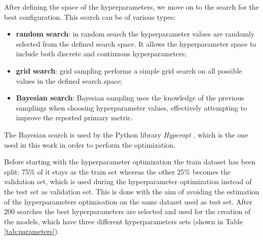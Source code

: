 \documentclass[a4paper, oneside, 11pt, openright]{book}
\begin{document}
				After defining the space of the hyperparameters, we move on to the search for the best configuration. This search can be of various types:
				\begin{itemize}
					\item \textbf{random search}: in random search the hyperparameter values are randomly selected from the defined search space. It allows the  hyperparameter space to include both discrete and continuous hyperparameters;
					\item \textbf{grid search}: grid sampling performs a simple grid search on all possible values in the defined search space;
					\item \textbf{Bayesian search}: Bayesian sampling uses the knowledge of the previous samplings when choosing hyperparameter values, effectively attempting to improve the reported primary metric. %
				\end{itemize}
				The Bayesian search is used by the Python library \textit{Hyperopt} \cite{Hyperopt}, which is the one used in this work in order to perform the optimization.
				
				Before starting with the hyperparameter optimization the train dataset has been split: 75\% of it stays as the train set whereas the other 25\% becomes the validation set, which is used during the hyperparameter optimization instead of the test set as validation set. This is done with the aim of avoiding the estimation of the hyperparameters optimisation on the same dataset used as test set.
				After 200 searches the best hyperparameters are selected and used for the creation of the models, which have three different hyperparameters sets (shown in Table \ref{tab:parameters}).
				
\end{document}
